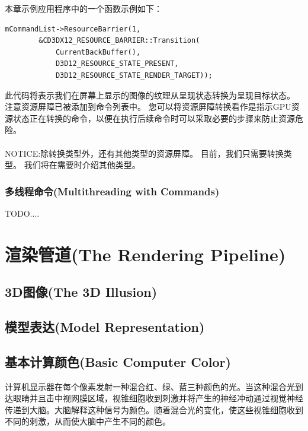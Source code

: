 \documentclass[11pt,a4paper,oldfontcommands]{memoir}
\begin{document}
{\begin{flushleft}
本章示例应用程序中的一个函数示例如下：\\
\begin{lstlisting}
mCommandList->ResourceBarrier(1,
        &CD3DX12_RESOURCE_BARRIER::Transition(
            CurrentBackBuffer(),
            D3D12_RESOURCE_STATE_PRESENT,
            D3D12_RESOURCE_STATE_RENDER_TARGET));
\end{lstlisting}
此代码将表示我们在屏幕上显示的图像的纹理从呈现状态转换为呈现目标状态。 注意资源屏障已被添加到命令列表中。 您可以将资源屏障转换看作是指示GPU资源状态正在转换的命令，以便在执行后续命令时可以采取必要的步骤来防止资源危险。\\
~\\
NOTICE:除转换类型外，还有其他类型的资源屏障。 目前，我们只需要转换类型。 我们将在需要时介绍其他类型。
\end{flushleft}
\subsection{多线程命令(Multithreading with Commands)}
TODO....

\chapter{渲染管道(The Rendering Pipeline)}
\section{3D图像(The 3D Illusion)}
\section{模型表达(Model Representation)}
\section{基本计算颜色(Basic Computer Color)}
\begin{flushleft}
计算机显示器在每个像素发射一种混合红、绿、蓝三种颜色的光。当这种混合光到达眼睛并且击中视网膜区域，视锥细胞收到刺激并将产生的神经冲动通过视觉神经传递到大脑。大脑解释这种信号为颜色。随着混合光的变化，使这些视锥细胞收到不同的刺激，从而使大脑中产生不同的颜色。\\
\end{flushleft}

}
\end{document}
